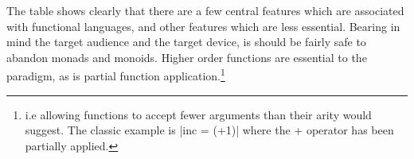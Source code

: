 \documentclass[11pt, a4paper]{article}
\begin{document}
\begin{center}
\end{center}

The table shows clearly that there are a few central features which are associated with functional
languages, and other features which are less essential. Bearing in mind the target audience and the
target device, is should be fairly safe to abandon monads and monoids. Higher order functions are
essential to the paradigm, as is partial function application.\footnote{i.e allowing functions to
    accept fewer arguments than their arity would suggest. The classic example is |inc = (+1)| where
    the + operator has been partially applied.}
\end{document}
